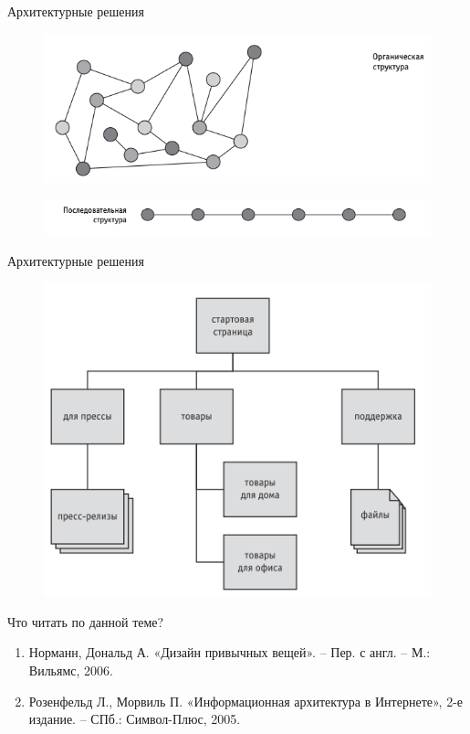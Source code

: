 \documentclass{beamer}
\begin{document}
\begin{frame}[t]{Архитектурные решения}
\begin{figure}[h]
\centering
\includegraphics[scale=0.6]{images/lec03-pic12.png}
\end{figure}
\begin{figure}[h]
\centering
\includegraphics[scale=0.6]{images/lec03-pic13.png}
\end{figure}
\end{frame} 

\begin{frame}[t]{Архитектурные решения}
\begin{figure}[h]
\centering
\includegraphics[scale=0.6]{images/lec03-pic14.png}
\end{figure}
\end{frame} 
\begin{frame}{Что читать по данной теме?}
\begin{enumerate}
\item Норманн, Дональд А. «Дизайн привычных вещей». – Пер. с англ. – М.: Вильямс, 2006.
\item Розенфельд Л., Морвиль П. «Информационная архитектура в Интернете», 2-е издание. – СПб.: Символ-Плюс, 2005.
\end{enumerate}
\end{frame}
\end{document}
